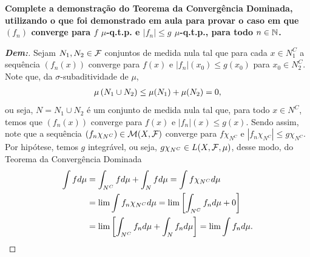 \textbf{Complete a demonstração do Teorema da Convergência Dominada, utilizando o que 
foi demonstrado em aula para provar o caso em que 
$(f_n)$ converge para $f$ $\mu$-q.t.p. e $|f_n| \le g$ $\mu$-q.t.p., para todo 
$n \in \mathbb N$.} 
\begin{proof}[\textbf{Dem:}] Sejam $N_1, N_2 \in \mathcal F$ conjuntos de medida nula 
  tal que para cada $x \in N_1^C$ a sequência $(f_n(x))$ converge para $f(x)$ e 
  $|f_n|(x_0) \le g(x_0)$ para $x_0 \in N_2^C$. Note que, da $\sigma$-subaditividade 
  de $\mu$,
  \begin{align*}
    \mu\left(N_1 \cup N_2\right) \le \mu(N_1) + \mu(N_2) = 0,
  \end{align*}
  ou seja, $N = N_1 \cup N_2$ é um conjunto de medida nula tal que, para todo 
  $x \in N^C$, temos que $(f_n(x))$ converge para $f(x)$ e $|f_n|(x) \le g(x)$. 
  Sendo assim, note que a sequência $(f_n\chi_{N^C}) \in \mathcal M(X, \mathcal F)$
  converge para $f\chi_{N^C}$
  e $|f_n\chi_{N^C}| \le g\chi_{N^C}$. Por hipótese, temos $g$ integrável, ou seja,
  $g\chi_{N^C} \in L(X, \mathcal F, \mu)$, desse modo, do Teorema da Convergência Dominada
  \begin{align*}
    \int f d\mu &= \int_{N^C} f d\mu + \int_N f d\mu = \int f\chi_{N^C} d\mu\\
    &= \lim \int f_n\chi_{N^C} d\mu = \lim \left[\int_{N^C} f_n d\mu + 0\right]\\ 
    &= \lim \left[\int_{N^C} f_n d\mu + \int_N f_n d\mu\right] 
    = \lim \int f_n d\mu. 
  \end{align*}
\end{proof}

